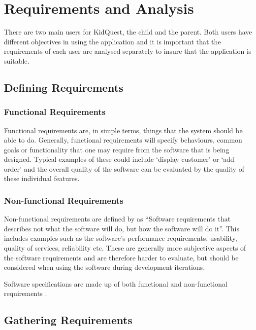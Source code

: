 \chapter{Requirements and Analysis}
\label{chap:methodology}

There are two main users for KidQuest, the child and the parent. 
Both users have different objectives in using the application and it is important that the requirements of each user are analysed separately to insure that the application is suitable.

\section{Defining Requirements}
\subsection{Functional Requirements}
Functional requirements are, in simple terms, things that the system should be able to do. 
Generally, functional requirements will specify behaviours, common goals or functionality that one may require from the software that is being designed.
Typical examples of these could include `display customer' or `add order' and the overall quality of the software can be evaluated by the quality of these individual features.

\subsection{Non-functional Requirements}
Non-functional requirements are defined by \cite[p.6]{chung2012non} as ``Software requirements that describes not what the software will do, but how the software will do it''.
This includes examples such as the software's performance requirements, usability, quality of services, reliability etc.
These are generally more subjective aspects of the software requirements and are therefore harder to evaluate, but should be considered when using the software during development iterations.

Software specifications are made up of both functional and non-functional requirements \cite[p.143]{chung2012non}. 

\section{Gathering Requirements}

